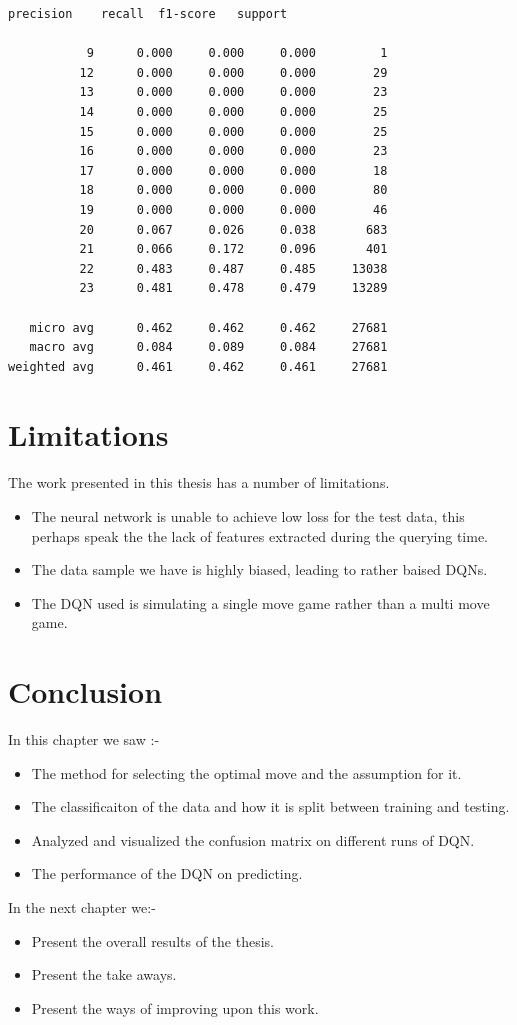 \begin{lstlisting}[caption=Statistics for various orderings]
             precision    recall  f1-score   support

           9      0.000     0.000     0.000         1
          12      0.000     0.000     0.000        29
          13      0.000     0.000     0.000        23
          14      0.000     0.000     0.000        25
          15      0.000     0.000     0.000        25
          16      0.000     0.000     0.000        23
          17      0.000     0.000     0.000        18
          18      0.000     0.000     0.000        80
          19      0.000     0.000     0.000        46
          20      0.067     0.026     0.038       683
          21      0.066     0.172     0.096       401
          22      0.483     0.487     0.485     13038
          23      0.481     0.478     0.479     13289

   micro avg      0.462     0.462     0.462     27681
   macro avg      0.084     0.089     0.084     27681
weighted avg      0.461     0.462     0.461     27681
\end{lstlisting}
\section{Limitations}
The work presented in this thesis has a number of limitations.
\begin{itemize}
    \item The neural network is unable to achieve low loss for the test data, this perhaps speak the the lack of features extracted during the querying time.
    \item The data sample we have is highly biased, leading to rather baised DQNs.
    \item The DQN used is simulating a single move game rather than a multi move game.
\end{itemize}

\section{Conclusion}
In this chapter we saw :-
\begin{itemize}
    \item The method for selecting the optimal move and the assumption for it.
    \item The classificaiton of the data and how it is split between training and testing.
    \item Analyzed and visualized the confusion matrix on different runs of DQN.
    \item The performance of the DQN on predicting.
\end{itemize}
In the next chapter we:-
\begin{itemize}
    \item Present the overall results of the thesis.
    \item Present the take aways.
    \item Present the ways of improving upon this work.
\end{itemize}
